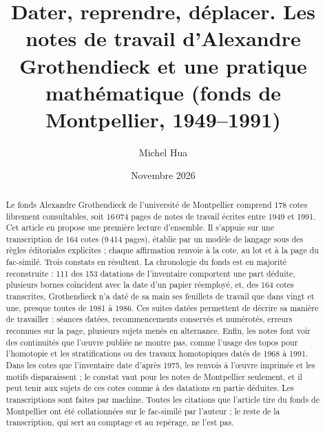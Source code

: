 \documentclass[11pt]{amsart}
\title[Les notes de travail d'Alexandre Grothendieck]{Dater, reprendre, déplacer. Les notes de travail d'Alexandre Grothendieck et une pratique mathématique (fonds de Montpellier, 1949--1991)}
\author[Michel Hua]{Michel Hua}
\date{Novembre 2026}
\begin{document}
\begin{abstract}
Le fonds Alexandre Grothendieck de l'université de Montpellier comprend 178 cotes librement consultables, soit 16\,074 pages de notes de travail écrites entre 1949 et 1991. Cet article en propose une première lecture d'ensemble. Il s'appuie sur une transcription de 164 cotes (9\,414 pages), établie par un modèle de langage sous des règles éditoriales explicites ; chaque affirmation renvoie à la cote, au lot et à la page du fac-similé. Trois constats en résultent. La chronologie du fonds est en majorité reconstruite : 111 des 153 datations de l'inventaire comportent une part déduite, plusieurs bornes coïncident avec la date d'un papier réemployé, et, des 164 cotes transcrites, Grothendieck n'a daté de sa main ses feuillets de travail que dans vingt et une, presque toutes de 1981 à 1986. Ces suites datées permettent de décrire sa manière de travailler : séances datées, recommencements conservés et numérotés, erreurs reconnues sur la page, plusieurs sujets menés en alternance. Enfin, les notes font voir des continuités que l'œuvre publiée ne montre pas, comme l'usage des topos pour l'homotopie et les stratifications ou des travaux homotopiques datés de 1968 à 1991. Dans les cotes que l'inventaire date d'après 1975, les renvois à l'œuvre imprimée et les motifs disparaissent ; le constat vaut pour les notes de Montpellier seulement, et il peut tenir aux sujets de ces cotes comme à des datations en partie déduites. Les transcriptions sont faites par machine. Toutes les citations que l'article tire du fonds de Montpellier ont été collationnées sur le fac-similé par l'auteur ; le reste de la transcription, qui sert au comptage et au repérage, ne l'est pas.
\end{abstract}
\end{document}

